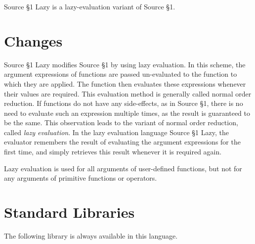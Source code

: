 





Source \S 1 Lazy is a lazy-evaluation variant of Source \S 1.

\section{Changes}

Source \S 1 Lazy modifies Source \S 1 by using
lazy evaluation. In
this scheme, the argument expressions of functions are passed un-evaluated
to the function to which they are applied. The function then evaluates
these expressions whenever their values are required. This evaluation method
is generally called normal order reduction. If functions
do not have any side-effects, as in Source \S 1,
there is no need to evaluate such an expression
multiple times, as the result is guaranteed to be the same. This observation
leads to the variant of normal order reduction, called \emph{lazy evaluation}.
In the lazy evaluation language Source \S 1 Lazy,
the evaluator remembers the result of evaluating the
argument expressions for the first time, and simply retrieves this result
whenever it is required again.

Lazy evaluation is used for all arguments of user-defined functions, but
not for any arguments of primitive functions or operators.





\newpage

















\section{Standard Libraries}

The following library is always available in this language.






    
